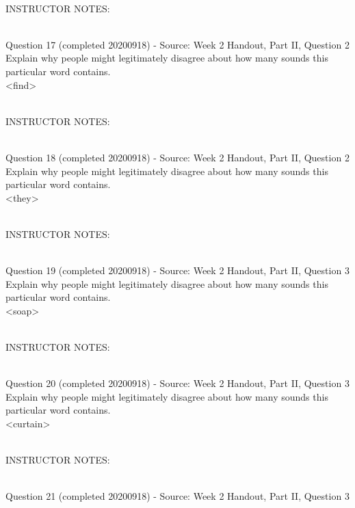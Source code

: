 \documentclass[12pt]{article}
\begin{document}
~\\
INSTRUCTOR NOTES: 


~\\

{\large Question 17} (completed 20200918) - Source: Week 2 Handout, Part II, Question 2\\

Explain why people might legitimately disagree about how many sounds this particular word contains.\\

<find>


~\\
INSTRUCTOR NOTES: 


~\\

{\large Question 18} (completed 20200918) - Source: Week 2 Handout, Part II, Question 2\\

Explain why people might legitimately disagree about how many sounds this particular word contains.\\

<they>


~\\
INSTRUCTOR NOTES: 


~\\

{\large Question 19} (completed 20200918) - Source: Week 2 Handout, Part II, Question 3\\

Explain why people might legitimately disagree about how many sounds this particular word contains.\\

<soap>


~\\
INSTRUCTOR NOTES: 


~\\

{\large Question 20} (completed 20200918) - Source: Week 2 Handout, Part II, Question 3\\

Explain why people might legitimately disagree about how many sounds this particular word contains.\\

<curtain>


~\\
INSTRUCTOR NOTES: 


~\\

{\large Question 21} (completed 20200918) - Source: Week 2 Handout, Part II, Question 3\\
\end{document}
